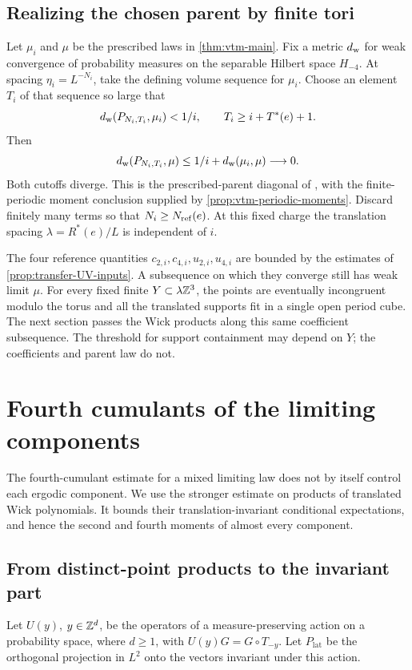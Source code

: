 \subsection{Realizing the chosen parent by finite tori}

Let $\mu_i$ and $\mu$ be the prescribed laws in
\cref{thm:vtm-main}. Fix a metric $d_{\rm w}$ for weak
convergence of probability measures on the separable Hilbert
space $H_{-4}$. At spacing $\eta_i=L^{-N_i}$, take the
defining volume sequence for $\mu_i$. Choose an element
$T_i$ of that sequence so large that
\[
 d_{\rm w}(P_{N_i,T_i},\mu_i)<1/i,\qquad
 T_i\ge i+T^*(e)+1.
\]
Then
\[
 d_{\rm w}(P_{N_i,T_i},\mu)
 \le1/i+d_{\rm w}(\mu_i,\mu)\longrightarrow0.
\]
Both cutoffs diverge. This is the prescribed-parent
diagonal of \cite[Corollary~7.4]{ContinuumExistence},
with the finite-periodic moment conclusion supplied by
\cref{prop:vtm-periodic-moments}. Discard finitely many terms
so that $N_i\ge N_{\rm ref}(e)$.
At this fixed charge the translation spacing
$\lambda=R^*(e)/L$ is independent of $i$.

The four reference quantities
$c_{2,i},c_{4,i},u_{2,i},u_{4,i}$ are bounded by the estimates
of \cref{prop:transfer-UV-inputs}. A subsequence on which
they converge still has weak limit $\mu$.
For every fixed finite $Y\subset\lambda\mathbb Z^3$, the points
are eventually incongruent modulo the torus and all the
translated supports fit in a single open period cube.
The next section passes the Wick products along this
same coefficient subsequence. The threshold for support
containment may depend on $Y$; the coefficients and parent
law do not.

\section{Fourth cumulants of the limiting components}
\label{sec:ultraviolet-limits}

The fourth-cumulant estimate for a mixed limiting law does not by
itself control each ergodic component. We use the stronger estimate
on products of translated Wick polynomials. It bounds their
translation-invariant conditional expectations, and hence the
second and fourth moments of almost every component.

\subsection{From distinct-point products to the invariant part}

Let $U(y)$,
$y\in\mathbb Z^d$, be the operators of a measure-preserving action on
a probability space, where $d\ge1$, with $U(y)G=G\circ T_{-y}$. Let
$P_{\mathrm{lat}}$ be the orthogonal projection in $L^2$ onto
the vectors invariant under this action.

